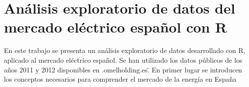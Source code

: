 \chapter{Análisis exploratorio de datos del mercado eléctrico español con R}




En este trabajo se presenta un análisis exploratorio de datos desarrollado con R,  aplicado al mercado eléctrico español. Se han utilizado los datos públicos de los años 2011 y 2012 disponibles en \www.omelholding.es\". En primer lugar se introducen los conceptos necesarios para comprender el mercado de la energía en España

%

%
